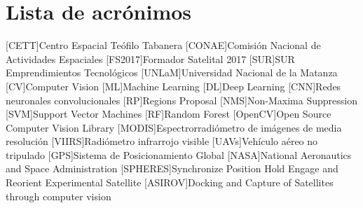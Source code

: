 \chapter*{Lista de acrónimos}
\label{chap:acronimos}

\begin{acronym}
[CETT]{Centro Espacial Teófilo Tabanera}
[CONAE]{Comisión Nacional de Actividades Espaciales}
[FS2017]{Formador Satelital 2017}
[SUR]{SUR Emprendimientos Tecnológicos}
[UNLaM]{Universidad Nacional de la Matanza}
[CV]{Computer Vision}
[ML]{Machine Learning}
[DL]{Deep Learning}
[CNN]{Redes neuronales convolucionales}
[RP]{Regions Proposal}
[NMS]{Non-Maxima Suppression}
[SVM]{Support Vector Machines}
[RF]{Random Forest}
[OpenCV]{Open Source Computer Vision Library}
[MODIS]{Espectrorradiómetro de imágenes de media resolución}
[VIIRS]{Radiómetro infrarrojo visible}
[UAVs]{Vehículo aéreo no tripulado}
[GPS]{Sistema de Posicionamiento Global}
[NASA]{National Aeronautics and Space Administration}
[SPHERES]{Synchronize Position Hold Engage and Reorient Experimental Satellite}
 [ASIROV]{Docking and Capture of Satellites through computer vision}
\end{acronym}


